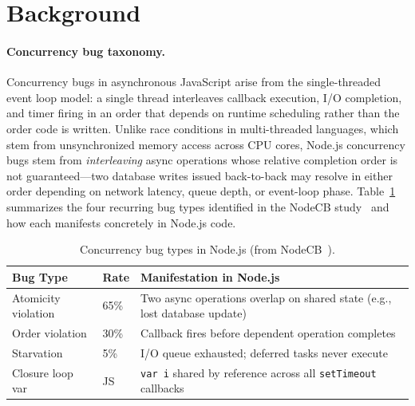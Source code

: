 \documentclass[runningheads]{llncs}
\begin{document}
\section{Background}
\label{sec:background}

\paragraph{Concurrency bug taxonomy.}
Concurrency bugs in asynchronous JavaScript arise from the single-threaded
event loop model: a single thread interleaves callback execution, I/O
completion, and timer firing in an order that depends on runtime
scheduling rather than the order code is written.
Unlike race conditions in multi-threaded languages, which stem from
unsynchronized memory access across CPU cores, Node.js concurrency bugs
stem from \emph{interleaving} async operations whose relative completion
order is not guaranteed---two database writes issued back-to-back may
resolve in either order depending on network latency, queue depth, or
event-loop phase.
Table~\ref{tab:taxonomy} summarizes the four recurring bug types
identified in the NodeCB study~\cite{nodecb2017} and how each manifests
concretely in Node.js code.

\begin{table}[tb]
  \centering
  \caption{Concurrency bug types in Node.js (from NodeCB~\cite{nodecb2017}).}
  \label{tab:taxonomy}
  \begin{tabular}{@{}llp{5.5cm}@{}}
    \toprule
    \textbf{Bug Type} & \textbf{Rate} & \textbf{Manifestation in Node.js} \\
    \midrule
    Atomicity violation & 65\% & Two async operations overlap on shared state (e.g., lost database update) \\
    Order violation     & 30\% & Callback fires before dependent operation completes \\
    Starvation          & 5\%  & I/O queue exhausted; deferred tasks never execute \\
    Closure loop var    & JS   & \texttt{var i} shared by reference across all \texttt{setTimeout} callbacks \\
    \bottomrule
  \end{tabular}
\end{table}
\end{document}
